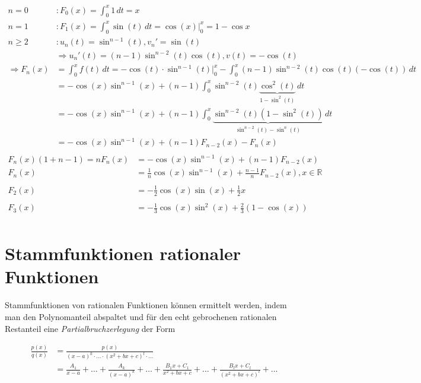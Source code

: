 \documentclass{article}
\begin{document}
\begin{enumerate}[a)]
  \begin{align*}
    n = 0 &\colon F_0(x) = \int_0^x 1 \,dt = x \\
    n = 1 &\colon F_1(x) = \int_0^x \sin(t) \,dt = \cos(x) {\Big |}_0^x = 1 - \cos{x} \\
    n \geq 2 &\colon u_n (t) = \sin^{n - 1} (t), v_n' = \sin (t) \\
          &\Rightarrow u_n' (t) = (n - 1) \sin^{n - 2}(t) \cos(t), v(t) = - \cos (t) \\
    \Rightarrow F_n(x) &= \int_0^x f(t) \,dt = - \cos(t) \cdot \sin^{n - 1} (t) {\Big |}_0^x - \int_0^x (n - 1) \sin^{n - 2}(t)\cos(t)(-\cos(t)) \,dt \\
          &= - \cos(x) \sin^{n - 1} (x) + (n - 1) \int_0^x \sin^{n - 2} (t) \underset{1 - \sin^2(t)}{\underbrace{\cos^2(t)}} \,dt \\
          &= - \cos(x) \sin^{n - 1} (x) + (n - 1) \int_0^x
            \underset{\sin^{n - 2} (t) - \sin^n(t)}{\underbrace{\sin^{n - 2} (t) \left(1 - \sin^2(t)\right)}} \,dt \\
          &= - \cos(x) \sin^{n - 1} (x) + (n - 1) F_{n - 2}(x) - F_n(x) \\
  \end{align*}
  \begin{align*}
    F_n(x) (1 + n - 1) = n F_n(x) &= - \cos(x) \sin^{n - 1}(x) + (n - 1) F_{n - 2}(x) \\
    F_n(x) &= \frac{1}{n} \cos(x) \sin^{n - 1} (x) + \frac{n - 1}{n} F_{n - 2}(x), x \in \mathbb{R} \\
    \\
    F_2(x) &= - \frac{1}{2} \cos(x) \sin(x) + \frac{1}{2}x \\
    \\
    F_3(x) &= - \frac{1}{3} \cos(x) \sin^2(x) + \frac{2}{3} (1 - \cos(x)) \\
  \end{align*}
\end{enumerate}

\section*{Stammfunktionen rationaler Funktionen}

Stammfunktionen von rationalen Funktionen können ermittelt werden, indem man den Polynomanteil abspaltet
und für den echt gebrochenen rationalen Restanteil eine \textit{Partialbruchzerlegung} der Form

\begin{align*}
  \frac{p(x)}{q(x)} &= \frac{p(x)}{(x - a)^k \cdot \ldots \cdot (x^2 + bx + c)^l \cdot \ldots} \\
                    &= \frac{A_1}{x - a} + \ldots + \frac{A_k}{(x - a)^k} + \ldots + \frac{B_1x + C_1}{x^2 + bx + c} + \ldots + \frac{B_lx + C_l}{(x^2 + bx + c)^l} + \ldots
\end{align*}
\end{document}

